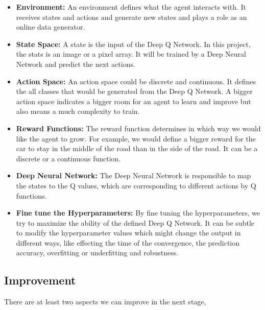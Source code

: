 \documentclass[a4paper]{article}
\begin{document}
\begin{itemize}
	
    \item \textbf{Environment:} An environment defines what the agent interacts with. It receives states and actions and generate new states and plays a role as an online data generator. 
    \item \textbf{State Space:} A state is the input of the Deep Q Network. In this project, the stats is an image or a pixel array. It will be trained by a Deep Neural Network and predict the next actions.
    \item \textbf{Action Space:} An action space could be discrete and continuous. It defines the all classes that would be generated from the Deep Q Network. A bigger action space indicates a bigger room for an agent to learn and improve but also means a much complexity to train.
    \item \textbf{Reward Functions:} The reward function determines in which way we would like the agent to grow. For example, we would define a bigger reward for the car to stay in the middle of the road than in the side of the road. It can be a discrete or a continuous function.
    \item \textbf{Deep Neural Network:} The Deep Neural Network is responsible to map the states to the Q values, which are corresponding to different actions by Q functions. 
    \item \textbf{Fine tune the Hyperparameters:} By fine tuning the hyperparameters, we try to maximize the ability of the defined Deep Q Network. It can be subtle to modify the hyperparameter values which might change the output in different ways, like effecting the time of the convergence, the prediction accuracy, overfitting or underfitting and robustness.
    
\end{itemize}


\subsection{Improvement}
There are at least two aspects we can improve in the next stage,
\end{document}
